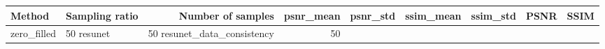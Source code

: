 \begin{tabular}{llrrrrrll}
\toprule
Method & Sampling ratio & Number of samples & psnr_mean & psnr_std & ssim_mean & ssim_std & PSNR & SSIM \\
\midrule
zero_filled & 50%
resunet & 50%
resunet_data_consistency & 50%
\bottomrule
\end{tabular}
